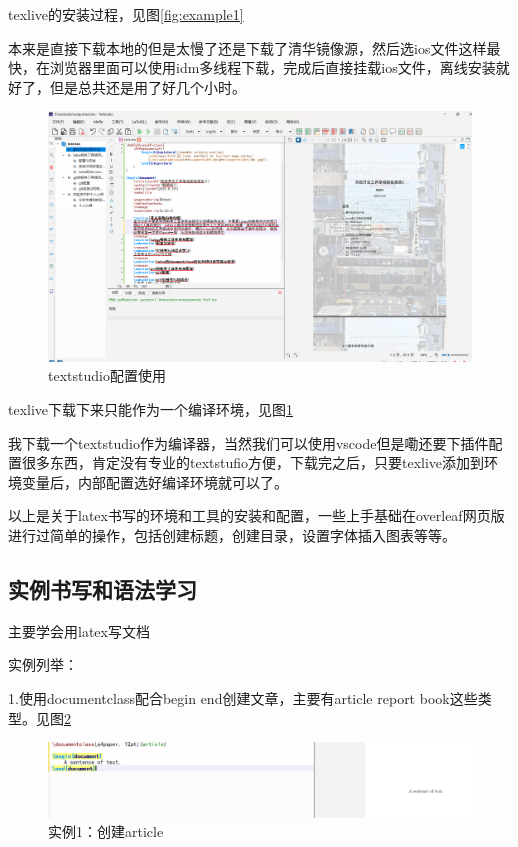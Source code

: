 \documentclass{article}
\begin{document}
	texlive的安装过程，见图\ref{fig:example1}
	
	本来是直接下载本地的但是太慢了还是下载了清华镜像源，然后选ios文件这样最快，在浏览器里面可以使用idm多线程下载，完成后直接挂载ios文件，离线安装就好了，但是总共还是用了好几个小时。
	
	\begin{figure}[h]  
		\centering
		\includegraphics[width=1\textwidth]{b.png}
		\caption{textstudio配置使用}
		\label{fig:example2}
	\end{figure}
	
	texlive下载下来只能作为一个编译环境，见图\ref{fig:example2}
	
	我下载一个textstudio作为编译器，当然我们可以使用vscode但是嘞还要下插件配置很多东西，肯定没有专业的textstufio方便，下载完之后，只要texlive添加到环境变量后，内部配置选好编译环境就可以了。
	
	以上是关于latex书写的环境和工具的安装和配置，一些上手基础在overleaf网页版进行过简单的操作，包括创建标题，创建目录，设置字体插入图表等等。
	
	\newpage
	
	\subsection{实例书写和语法学习}
	主要学会用latex写文档
	
	实例列举：
	
	1.使用documentclass配合begin end创建文章，主要有article report book这些类型。见图\ref{fig:example3}
	
	\begin{figure}[h]  
		\centering
		\includegraphics[width=1\textwidth]{d.png}
		\caption{实例1：创建article}
		\label{fig:example3}
	\end{figure}
	
\end{document}
